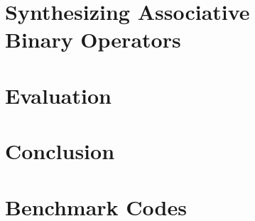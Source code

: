\documentclass[10pt]{main}
\begin{document}
\section{Synthesizing Associative\\
Binary Operators}
\label{synthesize}


\section{Evaluation}
\label{evaluation}


\section{Conclusion}
\label{conclusion}



%
%

\appendix
\section{Benchmark Codes}

\end{document}
